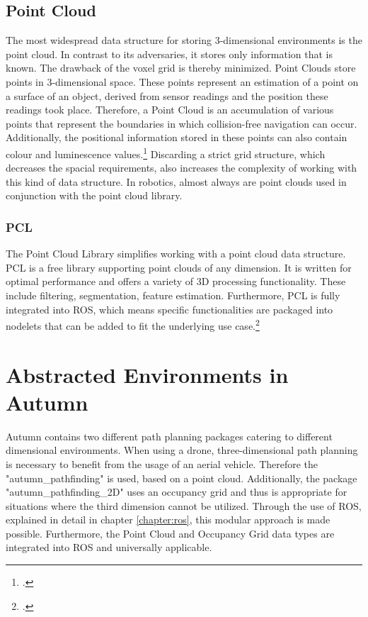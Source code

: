 \subsection{Point Cloud}
The most widespread data structure for storing 3-dimensional environments is the point cloud. In contrast to its adversaries, it stores only information that is known. The drawback of the voxel grid is thereby minimized. Point Clouds store points in 3-dimensional space. These points represent an estimation of a point on a surface of an object, derived from sensor readings and the position these readings took place. Therefore, a Point Cloud is an accumulation of various points that represent the boundaries in which collision-free navigation can occur.
Additionally, the positional information stored in these points can also contain colour and luminescence values.\footcite{tech27PointCloud2018}\newline
Discarding a strict grid structure, which decreases the spacial requirements, also increases the complexity of working with this kind of data structure. In robotics, almost always are point clouds used in conjunction with the point cloud library.

\subsubsection{PCL}
The Point Cloud Library simplifies working with a point cloud data structure. PCL is a free library supporting point clouds of any dimension. It is written for optimal performance and offers a variety of 3D processing functionality. These include filtering, segmentation, feature estimation. Furthermore, PCL is fully integrated into ROS, which means specific functionalities are packaged into nodelets that can be added to fit the underlying use case.\footcite{ConselhoNacionaldeDesenvolvimentoCientificoeTecnologico1995}

\section{Abstracted Environments in Autumn}
Autumn contains two different path planning packages catering to different dimensional environments. When using a drone, three-dimensional path planning is necessary to benefit from the usage of an aerial vehicle. Therefore the "autumn\_pathfinding" is used, based on a point cloud. Additionally, the package "autumn\_pathfinding\_2D" uses an occupancy grid and thus is appropriate for situations where the third dimension cannot be utilized.\newline
Through the use of ROS, explained in detail in chapter \ref{chapter:ros}, this modular approach is made possible. Furthermore, the Point Cloud and Occupancy Grid data types are integrated into ROS and universally applicable.   

